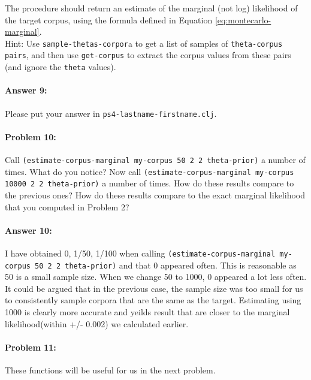\documentclass[10pt]{article}
\newcommand{\PSnum}{4}
\begin{document}
\noindent The procedure should return an estimate of the marginal (not log)
likelihood of the target corpus, using the formula defined in Equation
\ref{eq:montecarlo-marginal}.
\\

\noindent Hint: Use \texttt{sample-thetas-corpor}a to get a list of
samples of \texttt{theta-corpus pairs}, and then use
\texttt{get-corpus} to extract the corpus values from these pairs (and
ignore the \texttt{theta} values).

\paragraph{Answer 9:} Please put your answer in
\texttt{ps\PSnum-lastname-firstname.clj}.

\noindent\hrulefill %

\paragraph{Problem 10:}

\noindent Call \texttt{(estimate-corpus-marginal my-corpus 50 2 2
  theta-prior)} a number of times. What do you notice? Now call
\texttt{(estimate-corpus-marginal my-corpus 10000 2 2 theta-prior)} a
number of times. How do these results compare to the previous ones?
How do these results compare to the exact marginal
likelihood that you computed in Problem 2?

\paragraph{Answer 10:} I have obtained 0, 1/50, 1/100 when calling \texttt{(estimate-corpus-marginal my-corpus 50 2 2 theta-prior)} and that 0 appeared often. This is reasonable as 50 is a small sample size. When we change 50 to 1000, 0 appeared a lot less often. It could be argued that in the previous case, the sample size was too small for us to consistently sample corpora that are the same as the target. Estimating using 1000 is clearly more accurate and yeilds result that are closer to the marginal likelihood(within +/- 0.002) we calculated earlier.        

\noindent\hrulefill %

\paragraph{Problem 11:}
These functions will be useful for us in the next problem.
\end{document}
